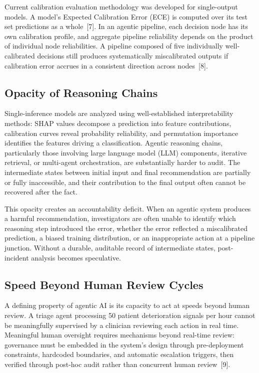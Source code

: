 Current calibration evaluation methodology was developed for
single-output models. A model's Expected Calibration Error (ECE) is
computed over its test set predictions as a whole~{[}7{]}. In an agentic
pipeline, each decision node has its own calibration profile, and
aggregate pipeline reliability depends on the product of individual node
reliabilities. A pipeline composed of five individually well-calibrated
decisions still produces systematically miscalibrated outputs if
calibration error accrues in a consistent direction across nodes~{[}8{]}.

\subsection{Opacity of Reasoning
Chains}\label{opacity-of-reasoning-chains}

Single-inference models are analyzed using well-established
interpretability methods: SHAP values decompose a prediction into
feature contributions, calibration curves reveal probability
reliability, and permutation importance identifies the features driving
a classification. Agentic reasoning chains, particularly those involving
large language model (LLM) components, iterative retrieval, or
multi-agent orchestration, are substantially harder to audit. The
intermediate states between initial input and final recommendation are
partially or fully inaccessible, and their contribution to the final
output often cannot be recovered after the fact.

This opacity creates an accountability deficit. When an agentic system
produces a harmful recommendation, investigators are often unable to
identify which reasoning step introduced the error, whether the error
reflected a miscalibrated prediction, a biased training distribution, or
an inappropriate action at a pipeline junction. Without a durable,
auditable record of intermediate states, post-incident analysis becomes
speculative.

\subsection{Speed Beyond Human Review
Cycles}\label{speed-beyond-human-review-cycles}

A defining property of agentic AI is its capacity to act at speeds
beyond human review. A triage agent processing 50 patient deterioration
signals per hour cannot be meaningfully supervised by a clinician
reviewing each action in real time. Meaningful human oversight requires
mechanisms beyond real-time review: governance must be embedded in the
system's design through pre-deployment constraints, hardcoded
boundaries, and automatic escalation triggers, then verified through
post-hoc audit rather than concurrent human review~{[}9{]}.

